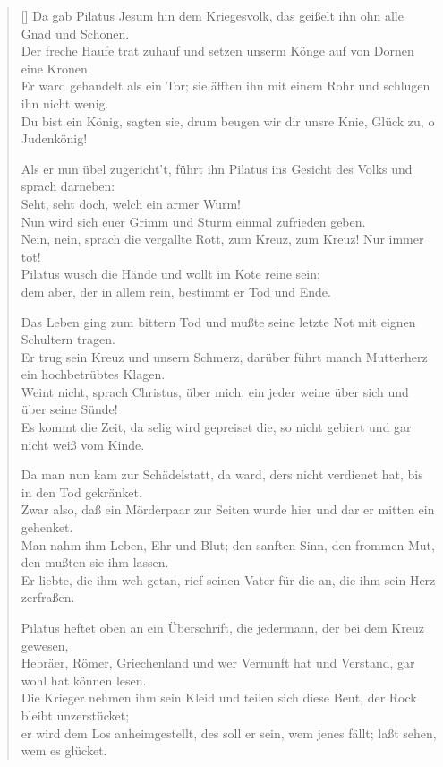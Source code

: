 \begin{center}
\begin{verse}[\versewidth]
 Da gab Pilatus Jesum hin dem Kriegesvolk, das geißelt ihn ohn alle Gnad und Schonen.\\
Der freche Haufe trat zuhauf und setzen unserm Könge auf von Dornen eine Kronen.\\
Er ward gehandelt als ein Tor; sie äfften ihn mit einem Rohr und schlugen ihn nicht wenig.\\
\flqq Du bist ein König\frqq, sagten sie, \flqq drum beugen wir dir unsre Knie, Glück zu, o Judenkönig!\frqq

 Als er nun übel zugericht't, führt ihn Pilatus ins Gesicht des Volks und sprach darneben:\\
\flqq Seht, seht doch, welch ein armer Wurm!\\
Nun wird sich euer Grimm und Sturm einmal zufrieden geben.\frqq \\
\flqq Nein, nein\frqq, sprach die vergallte Rott, \flqq zum Kreuz, zum Kreuz! Nur immer tot!\frqq\\
Pilatus wusch die Hände und wollt im Kote reine sein;\\
dem aber, der in allem rein, bestimmt er Tod und Ende.

 Das Leben ging zum bittern Tod und mußte seine letzte Not mit eignen Schultern tragen.\\
Er trug sein Kreuz und unsern Schmerz, darüber führt manch Mutterherz ein hochbetrübtes Klagen.\\
\flqq Weint nicht\frqq, sprach Christus, \flqq über mich, ein jeder weine über sich und über seine Sünde!\frqq \\
Es kommt die Zeit, da selig wird gepreiset die, so nicht gebiert und gar nicht weiß vom Kinde.

 Da man nun kam zur Schädelstatt, da ward, ders nicht verdienet hat, bis in den Tod gekränket.\\
Zwar also, daß ein Mörderpaar zur Seiten wurde hier und dar er mitten ein gehenket.\\
Man nahm ihm Leben, Ehr und Blut; den sanften Sinn, den frommen Mut, den mußten sie ihm lassen.\\
Er liebte, die ihm weh getan, rief seinen Vater für die an, die ihm sein Herz zerfraßen.

 Pilatus heftet oben an ein Überschrift, die jedermann, der bei dem Kreuz gewesen,\\
Hebräer, Römer, Griechenland und wer Vernunft hat und Verstand, gar wohl hat können lesen.\\
Die Krieger nehmen ihm sein Kleid und teilen sich diese Beut, der Rock bleibt unzerstücket;\\
er wird dem Los anheimgestellt, des soll er sein, wem jenes fällt; laßt sehen, wem es glücket.


\end{verse}
\end{center}
